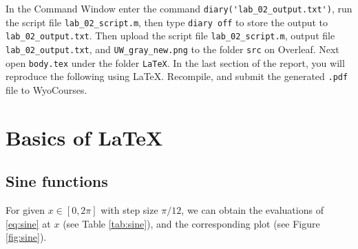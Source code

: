 
In the Command Window enter the command \verb`diary('lab_02_output.txt')`, run the script file \verb|lab_02_script.m|, then type \verb`diary off` to store the output to \verb`lab_02_output.txt`. Then upload the script file \verb|lab_02_script.m|, output file \verb|lab_02_output.txt|, and \verb|UW_gray_new.png| to the folder \verb|src| on Overleaf. Next open \verb|body.tex| under the folder \verb|LaTeX|. In the last section of the report, you will reproduce the following using \LaTeX{}. Recompile, and submit the generated \verb|.pdf| file to WyoCourses.
%
\newpage

\section{Basics of \LaTeX{}}
\label{sec:bol}
\subsection{Sine functions}
For given $x \in [0, 2\pi]$ with step size $\pi/12$, we can obtain the evaluations of \eqref{eq:sine} at $x$ (see Table \ref{tab:sine}), and the corresponding plot (see Figure \ref{fig:sine}).

